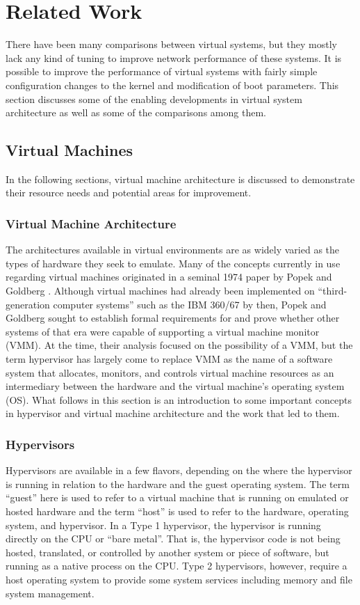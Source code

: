 \chapter{Related Work}
\label{sec:related_work}
There have been many comparisons between virtual systems, but they mostly lack any kind of tuning to improve network performance of these systems.
It is possible to improve the performance of virtual systems with fairly simple configuration changes to the kernel and modification of boot parameters.
This section discusses some of the enabling developments in virtual system architecture as well as some of the comparisons among them.  

\section{Virtual Machines}
\label{sec:virtualmachines}
In the following sections, virtual machine architecture is discussed to demonstrate their resource needs and potential areas for improvement.

\subsection{Virtual Machine Architecture}
\label{sec:vmarchitecture}
The architectures available in virtual environments are as widely varied as the types of hardware they seek to emulate.
Many of the concepts currently in use regarding virtual machines originated in a seminal 1974 paper by Popek and Goldberg \autocite{_popek_1}.
Although virtual machines had already been implemented on ``third-generation computer systems'' such as the IBM 360/67 by then, Popek and Goldberg sought to establish formal requirements for and prove whether other systems of that era were capable of supporting a virtual machine monitor (VMM)\autocite{_popek_1}.
At the time, their analysis focused on the possibility of a VMM, but the term hypervisor has largely come to replace VMM as the name of a software system that allocates, monitors, and controls virtual machine resources as an intermediary between the hardware and the virtual machine's operating system (OS).
What follows in this section is an introduction to some important concepts in hypervisor and virtual machine architecture and the work that led to them.

\subsection{Hypervisors}
\label{sec:hypervisors}
Hypervisors are available in a few flavors, depending on the where the hypervisor is running in relation to the hardware and the guest operating system.
The term ``guest'' here is used to refer to a virtual machine that is running on emulated or hosted hardware and the term ``host'' is used to refer to the hardware, operating system, and hypervisor.  
In a Type 1 hypervisor, the hypervisor is running directly on the CPU or ``bare metal''.
That is, the hypervisor code is not being hosted, translated, or controlled by another system or piece of software, but running as a native process on the CPU.
Type 2 hypervisors, however, require a host operating system to provide some system services including memory and file system management.


